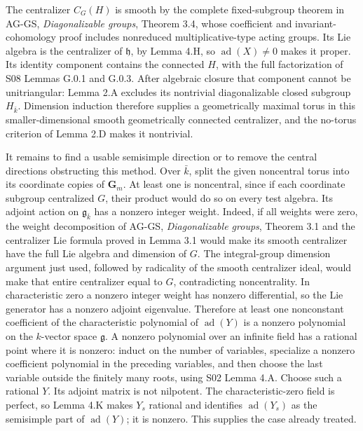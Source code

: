 \documentclass[11pt,a4paper,openany]{report}
\begin{document}
The centralizer \(C_G(H)\) is smooth by the complete fixed-subgroup theorem in AG-GS, \emph{Diagonalizable groups}, Theorem 3.4, whose coefficient and invariant-cohomology proof includes nonreduced multiplicative-type acting groups. Its Lie algebra is the centralizer of \(\mathfrak h\), by Lemma 4.H, so \(\operatorname{ad}(X)\ne0\) makes it proper. Its identity component contains the connected \(H\), with the full factorization of S08 Lemmas G.0.1 and G.0.3. After algebraic closure that component cannot be unitriangular: Lemma 2.A excludes its nontrivial diagonalizable closed subgroup \(H_{\bar k}\). Dimension induction therefore supplies a geometrically maximal torus in this smaller-dimensional smooth geometrically connected centralizer, and the no-torus criterion of Lemma 2.D makes it nontrivial.

It remains to find a usable semisimple direction or to remove the central directions obstructing this method. Over \(\bar k\), split the given noncentral torus into its coordinate copies of \(\mathbf G_m\). At least one is noncentral, since if each coordinate subgroup centralized \(G\), their product would do so on every test algebra. Its adjoint action on \(\mathfrak g_{\bar k}\) has a nonzero integer weight. Indeed, if all weights were zero, the weight decomposition of AG-GS, \emph{Diagonalizable groups}, Theorem 3.1 and the centralizer Lie formula proved in Lemma 3.1 would make its smooth centralizer have the full Lie algebra and dimension of \(G\). The integral-group dimension argument just used, followed by radicality of the smooth centralizer ideal, would make that entire centralizer equal to \(G\), contradicting noncentrality. In characteristic zero a nonzero integer weight has nonzero differential, so the Lie generator has a nonzero adjoint eigenvalue. Therefore at least one nonconstant coefficient of the characteristic polynomial of \(\operatorname{ad}(Y)\) is a nonzero polynomial on the \(k\)-vector space \(\mathfrak g\). A nonzero polynomial over an infinite field has a rational point where it is nonzero: induct on the number of variables, specialize a nonzero coefficient polynomial in the preceding variables, and then choose the last variable outside the finitely many roots, using S02 Lemma 4.A. Choose such a rational \(Y\). Its adjoint matrix is not nilpotent. The characteristic-zero field is perfect, so Lemma 4.K makes \(Y_s\) rational and identifies \(\operatorname{ad}(Y_s)\) as the semisimple part of \(\operatorname{ad}(Y)\); it is nonzero. This supplies the case already treated.
\end{document}
